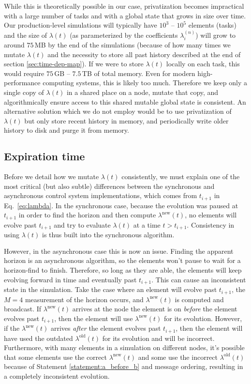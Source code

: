 \begin{bibunit}[unsrtnat]
While this is theoretically possible in our case, privatization becomes
impractical with a large number of tasks and with a global state that grows in
size over time. Our production-level simulations will typically have $10^3$ --
$10^5$ elements (tasks) and the size of $\lambda(t)$ (as parameterized by the
coefficients $\lambda_i^{(n)}$) will grow to around $75\,$MB by the end of the
simulations (because of how many times we mutate $\lambda(t)$ and the necessity
to store all past history described at the end of section
\ref{sec:time-dep-map}). If we were to store $\lambda(t)$ locally on each task,
this would require $75\,$GB -- $7.5\,$TB of total memory. Even for modern
high-performance computing systems, this is likely too much. Therefore we keep
only a single copy of $\lambda(t)$ in a shared place on a node, mutate that
copy, and algorithmically ensure access to this shared mutable global state is
consistent. An alternative solution which we do not employ would be to use
privatization of $\lambda(t)$ but only store recent history in memory, and
periodically write older history to disk and purge it from memory.

\subsection{Expiration time\label{sec:exp-time}}

Before we detail how we mutate $\lambda(t)$ consistently, we must explain one of
the most critical (but also subtle) differences between the synchronous and
asynchronous control system implementations, which comes from $t_{i+1}$ in
Eq.~\eqref{eq:lambda}. In the synchronous case,
because the evolution was paused at
$t_{i+1}$ in order to find the horizon and then compute
$\lambda^\mathrm{new}(t)$, no elements will evolve past $t_{i+1}$ and try to evaluate
$\lambda(t)$ at a time $t > t_{i+1}$. Consistency in using $\lambda(t)$ is thus
built into the synchronous algorithm.

However, in the asynchronous case this is now an issue. Finding the apparent
horizon is an asynchronous algorithm, so the elements won't pause to wait for a
horizon-find to finish. Therefore, so long as they are able, the elements will
keep evolving forward in time and eventually past $t_{i+1}$. This can cause an
inconsistent state in the simulation. Take the case where an element will evolve
past $t_{i+1}$, the $M=4$ measurement of the horizon occurs, and
$\lambda^\mathrm{new}(t)$ is computed and broadcast. If
$\lambda^\mathrm{new}(t)$ arrives at the node the element is on \textit{before}
the element evolves past $t_{i+1}$, then the element will use
$\lambda^\mathrm{new}(t)$ for its evolution. However, if the
$\lambda^\mathrm{new}(t)$ arrives \textit{after} the element evolves past
$t_{i+1}$, then the element will have used the outdated
$\lambda^\mathrm{old}(t)$ for its evolution and will be incorrect. Furthermore,
with many elements in a simulation on different nodes, it's possible that some
elements use the correct $\lambda^\mathrm{new}(t)$ and some use the incorrect
$\lambda^\mathrm{old}(t)$ because of Statement \ref{statement:a_before_b} and
message ordering, resulting in a completely inconsistent evolution.


\end{bibunit}
